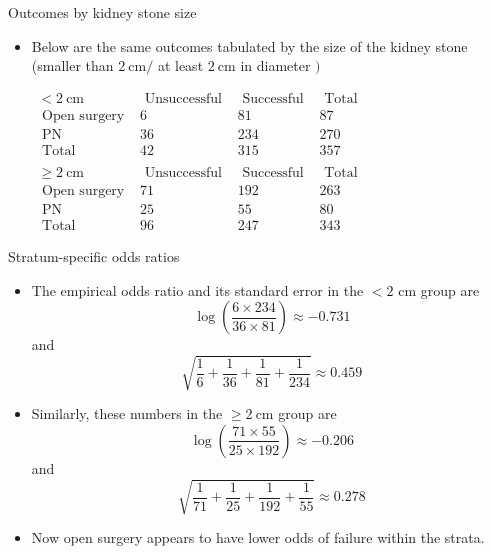 \documentclass[10pt,handout]{beamer}\usepackage[]{graphicx}\usepackage[]{color}
\begin{document}
\begin{frame}{Outcomes by kidney stone size}
	\begin{itemize}
		\item Below are the same outcomes tabulated by the size of the kidney stone (smaller than $2 \mathrm{~cm} /$ at least $2 \mathrm{~cm}$ in diameter $)$
		
		\vspace{0.2in}
		
		
$\begin{array}{lccc}
	<2 \mathrm{~cm} & \text { Unsuccessful } & \text { Successful } & \text { Total } \\
	\text { Open surgery } & 6 & 81 & 87 \\
	\text { PN } & 36 & 234 & 270 \\
	\text { Total } & 42 & 315 & 357 \\
	& & & \\
	\geq 2 \mathrm{~cm} & \text { Unsuccessful } & \text { Successful } & \text { Total } \\
	\text { Open surgery } & 71 & 192 & 263 \\
	\text { PN } & 25 & 55 & 80 \\
	\text { Total } & 96 & 247 & 343
\end{array}$
	\end{itemize}
\end{frame}


\begin{frame}{Stratum-specific odds ratios}
	\begin{itemize}
		\item The empirical odds ratio and its standard error in the $<2$
		cm group are
		$$
		\log \left(\frac{6 \times 234}{36 \times 81}\right) \approx-0.731
		$$
		and
		$$
		\sqrt{\frac{1}{6}+\frac{1}{36}+\frac{1}{81}+\frac{1}{234}} \approx 0.459
		$$
		\item Similarly, these numbers in the $\geq 2 \mathrm{~cm}$ group are
		$$
		\log \left(\frac{71 \times 55}{25 \times 192}\right) \approx-0.206
		$$
		and
		$$
		\sqrt{\frac{1}{71}+\frac{1}{25}+\frac{1}{192}+\frac{1}{55}} \approx 0.278
		$$
		\item Now open surgery appears to have lower odds of failure within the strata.
	\end{itemize}
	
\end{frame}
\end{document}
